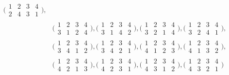 \documentclass[11pt, a4paper, dvipdfmx]{jsarticle}
\theoremstyle{definition}
\theoremstyle{mystyle}
\numberwithin{equation}{section} %
\begin{document}
\begin{align*}
    \Big(\begin{array}{cccc}
        1 & 2 & 3 & 4 \\
        2 & 4 & 3 & 1
    \end{array}\Big), \\%
    &\Big(\begin{array}{cccc}
        1 & 2 & 3 & 4 \\
        3 & 1 & 2 & 4
    \end{array}\Big),  
    \Big(\begin{array}{cccc}
        1 & 2 & 3 & 4 \\
        3 & 1 & 4 & 2
    \end{array}\Big), 
    \Big(\begin{array}{cccc}
        1 & 2 & 3 & 4 \\
        3 & 2 & 1 & 4
    \end{array}\Big),   
    \Big(\begin{array}{cccc}
        1 & 2 & 3 & 4 \\
        3 & 2 & 4 & 1
    \end{array}\Big), \\%
    &\Big(\begin{array}{cccc}
        1 & 2 & 3 & 4 \\
        3 & 4 & 1 & 2
    \end{array}\Big),
    \Big(\begin{array}{cccc}
        1 & 2 & 3 & 4 \\
        3 & 4 & 2 & 1
    \end{array}\Big), 
    \Big(\begin{array}{cccc}
        1 & 2 & 3 & 4 \\
        4 & 1 & 2 & 3
    \end{array}\Big), 
    \Big(\begin{array}{cccc}
        1 & 2 & 3 & 4 \\
        4 & 1 & 3 & 2
    \end{array}\Big), \\%
    &\Big(\begin{array}{cccc}
        1 & 2 & 3 & 4 \\
        4 & 2 & 1 & 3
    \end{array}\Big), 
    \Big(\begin{array}{cccc}
        1 & 2 & 3 & 4 \\
        4 & 2 & 3 & 1
    \end{array}\Big), 
    \Big(\begin{array}{cccc}
        1 & 2 & 3 & 4 \\
        4 & 3 & 1 & 2
    \end{array}\Big), 
    \Big(\begin{array}{cccc}
        1 & 2 & 3 & 4 \\
        4 & 3 & 2 & 1
    \end{array}\Big) 
\end{align*}
\end{document}
